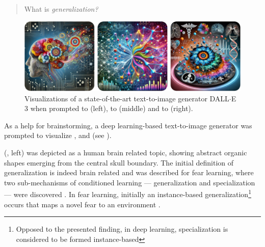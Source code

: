     \begin{quote}
        \centering \Large
        What is \emph{generalization?}
    \end{quote}

    \begin{figure}
        \includegraphics[width=\textwidth]{sections/01_introduction/figures/synthesized_generalization.pdf}
        \caption{Visualizations of a state-of-the-art text-to-image generator DALL$\cdot$E 3 \citep{xx} when prompted to  (left), to  (middle) and to  (right).}
        \label{fig:synthesized_generalization}
    \end{figure}

    As a help for brainstorming, a deep learning-based text-to-image generator \citep{xx} was prompted to visualize ,  and  (see ).

     (, left) was depicted as a human brain related topic, showing abstract organic shapes emerging from the central skull boundary.
    The initial definition of generalization is indeed brain related and was described for fear learning, where two sub-mechanisms of conditioned learning --- generalization and specialization --- were discovered \citep{xx, banich2011generalization}. %
    In fear learning, initially an instance-based generalization\footnote{Opposed to the presented finding, in deep learning, specialization is considered to be formed instance-based} occurs that maps a novel fear to an environment \citep{banich2011generalization}.

